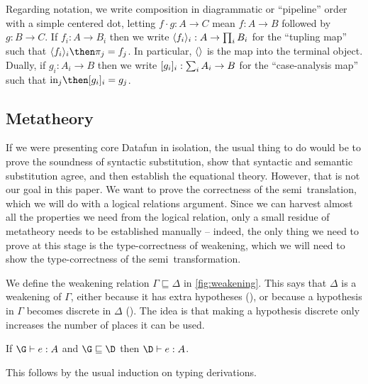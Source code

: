 Regarding notation, we write composition in diagrammatic or ``pipeline'' order with a simple centered dot, letting $f \cdot g : A \to C$ mean $f : A \to B$ followed by $g : B \to C$.
%
If $f_i : A \to B_i$ then we write $\langle{f_i}\rangle_i : A \to \prod_i B_i$ for the
``tupling map'' such that $\fork{f_i}_i \then \pi_j = f_j$.
%
In particular, $\langle{}\rangle$ is the map into the terminal object.
%
Dually, if $g_i : A_i \to B$ then we write $[{g_i}]_i : \sum_i A_i
\to B$ for the ``case-analysis map'' such that $\injc_j \then \krof{g_i}_i =
g_j$.


\subsection{Metatheory}
\label{sec:weakening}

If we were presenting core Datafun in isolation, the usual thing to do would be
to prove the soundness of syntactic substitution, show that syntactic and
semantic substitution agree, and then establish the equational theory. However,
that is not our goal in this paper. We want to prove the correctness of the
semi\naive\ translation, which we will do with a logical relations argument.
Since we can harvest almost all the properties we need from the logical
relation, only a small residue of metatheory needs to be established manually --
indeed, the only thing we need to prove at this stage is the type-correctness of
weakening, which we will need to show the type-correctness of the
semi\naive\ transformation.

We define the weakening relation $\Gamma \sqsubseteq \Delta$ in
\cref{fig:weakening}. This says that $\Delta$ is a weakening of $\Gamma$, either
because it has extra hypotheses (), or because a hypothesis in $\Gamma$
becomes discrete in $\Delta$ (). The idea is that making a hypothesis
discrete only increases the number of places it can be used.

\begin{lemma}\label{thm:weaken}
  If\/ $\J e \G A$ and $\G \sqsubseteq \D$ then $\J e \D A$.
\end{lemma}

\noindent This follows by the usual induction on typing derivations.


